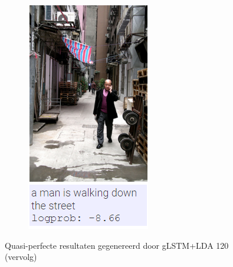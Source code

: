 \begin{figure}
\begin{subfigure}{.5\textwidth}
				\includegraphics[width=.8\linewidth]{Images/Results/Perfect/walking_down_the_street}
				\label{fig:perfectresults8}
			\end{subfigure}	
			\caption{Quasi-perfecte resultaten gegenereerd door gLSTM+LDA 120 (vervolg)}
			\label{fig:perfectresults_2}
		\end{figure}


